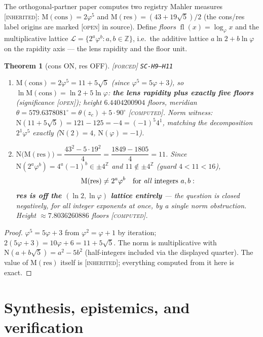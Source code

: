 \documentclass[11pt]{article}
\newcommand{\tagF}{\textcolor{cF}{\textsc{[forced]}}}
\newcommand{\tagC}{\textcolor{cC}{\textsc{[computed]}}}
\newcommand{\tagI}{\textcolor{cI}{\textsc{[inherited]}}}
\newcommand{\tagO}{\textcolor{cO}{\textsc{[open]}}}
\newcommand{\hx}[1]{\textcolor{cC}{\footnotesize\texttt{#1}}}
\newcommand{\Z}{\mathbb{Z}}
\newcommand{\gp}{\varphi}
\newcommand{\M}{\mathrm{M}}
\newcommand{\Nm}{\mathrm{N}}
\theoremstyle{plain}
\newtheorem{theorem}{Theorem}[section]
\theoremstyle{definition}
\theoremstyle{remark}
\begin{document}
The orthogonal-partner paper computes two registry Mahler measures \tagI{}:
$\M(\mathrm{cons})=2\gp^5$ and $\M(\mathrm{res})=(43+19\sqrt5)/2$ (the cons/res label
origins are marked \tagO{} in source). Define \emph{floors}
$\operatorname{fl}(x)=\log_\gp x$ and the multiplicative lattice
$\mathcal L=\{2^a\gp^b : a,b\in\Z\}$, i.e.\ the additive lattice
$a\ln2+b\ln\gp$ on the rapidity axis --- the lens rapidity and the floor unit.

\begin{theorem}[cons ON, res OFF]\label{thm:registry}\tagF{} \hx{SC-H9--H11}
\begin{enumerate}[nosep,label=(\alph*)]
\item $\M(\mathrm{cons})=2\gp^5=11+5\sqrt5$ (since $\gp^5=5\gp+3$), so
$\ln\M(\mathrm{cons})=\ln2+5\ln\gp$: \textbf{the lens rapidity plus exactly five
floors} (significance \tagO{}); height $6.4404200904$ floors, meridian
$\theta=579.6378081^\circ=\theta(z_c)+5\cdot90^\circ$ \tagC{}. Norm witness:
$\Nm(11+5\sqrt5)=121-125=-4=(-1)^5 4^1$, matching the decomposition $2^1\gp^5$
exactly ($\Nm(2)=4$, $\Nm(\gp)=-1$).
\item $\Nm\bigl(\M(\mathrm{res})\bigr)=\dfrac{43^2-5\cdot19^2}{4}=\dfrac{1849-1805}{4}
=11$. Since $\Nm(2^a\gp^b)=4^a(-1)^b\in\pm4^{\Z}$ and $11\notin\pm4^{\Z}$ (guard
$4<11<16$),
\[
\M(\mathrm{res})\neq 2^a\gp^b\quad\text{for \emph{all} integers } a,b :
\]
\textbf{res is off the $(\ln2,\ln\gp)$ lattice entirely} --- the question is closed
negatively, for all integer exponents at once, by a single norm obstruction. Height
$\approx7.8036260886$ floors \tagC{}.
\end{enumerate}
\end{theorem}

\begin{proof}
$\gp^5=5\gp+3$ from $\gp^2=\gp+1$ by iteration; $2(5\gp+3)=10\gp+6=11+5\sqrt5$. The
norm is multiplicative with $\Nm(a+b\sqrt5)=a^2-5b^2$ (half-integers included via the
displayed quarter). The value of $\M(\mathrm{res})$ itself is \tagI{}; everything
computed from it here is exact.
\end{proof}

\part{Synthesis, epistemics, and verification}
\end{document}
